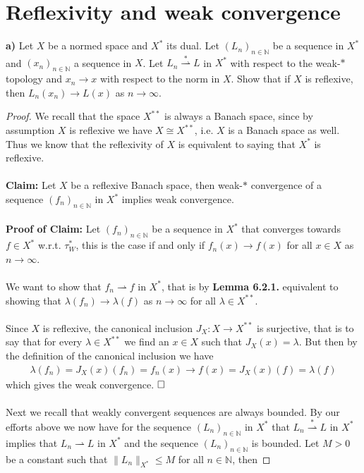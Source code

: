 \documentclass[12pt,a4paper]{article}
\theoremstyle{definition}
\newcommand{\wto}{\rightharpoonup}
\newcommand{\wstarto}{\overset{*}\rightharpoonup}
\begin{document}
\section{Reflexivity and weak convergence}
\textbf{a)} Let $X$ be a normed space and $X^*$ its dual. Let $(L_n)_{n \in \mathbb{N}}$ be a sequence in $X^*$ and $(x_n)_{n \in \mathbb{N}}$ a sequence in $X$. Let $L_n \overset{*}\wto L$ in $X^*$ with respect to the weak-$*$ topology and $x_n \to x$ with respect to the norm in $X$. Show that if $X$ is reflexive, then $L_n(x_n) \to L(x)$ as $n \to \infty$. 
\begin{proof}
We recall that the space $X^{**}$ is always a Banach space, since by assumption $X$ is reflexive we have $X \cong X^{**}$, i.e. $X$ is a Banach space as well. Thus we know that the reflexivity of $X$ is equivalent to saying that $X^*$ is reflexive.
\\\\
\textbf{Claim:} Let $X$ be a reflexive Banach space, then weak-$*$ convergence of a sequence $(f_n)_{n \in \mathbb{N}}$ in $X^*$ implies weak convergence. 
\\\\
\textbf{Proof of Claim:} Let $(f_n)_{n \in \mathbb{N}}$ be a sequence in $X^*$ that converges towards $f \in X^*$ w.r.t. $\tau_W^*$, this is the case if and only if $f_n (x) \to f(x)$ for all $x \in X$ as $n \to \infty$. 
\\\\
We want to show that $f_n \wto f$ in $X^*$, that is by \textbf{Lemma 6.2.1.} equivalent to showing that $\lambda (f_n) \to \lambda (f)$ as $n \to \infty$ for all $\lambda \in X^{**}$.
\\\\
Since $X$ is reflexive, the canonical inclusion $J_X: X \to X^{**}$ is surjective, that is to say that for every $\lambda \in X^{**}$ we find an $x \in X$ such that $J_X(x)= \lambda$. But then by the definition of the canonical inclusion we have
\begin{align*}
\lambda (f_n)= J_X(x)(f_n) = f_n(x) \to f(x) = J_X(x)(f)= \lambda (f) 
\end{align*}
which gives the weak convergence. $\hfill \Box$
\\\\
Next we recall that weakly convergent sequences are always bounded. By our efforts above we now have for the sequence $(L_n)_{n \in \mathbb{N}}$ in $X^*$ that $L_n \wstarto L$ in $X^*$ implies that $L_n \wto L$ in $X^*$ and the sequence $(L_n)_{n \in \mathbb{N}}$ is bounded. Let $M >0$ be a constant such that $\|L_n\|_{X^*} \leq M$ for all $n \in \mathbb{N}$, then 

\end{proof}
\end{document}
